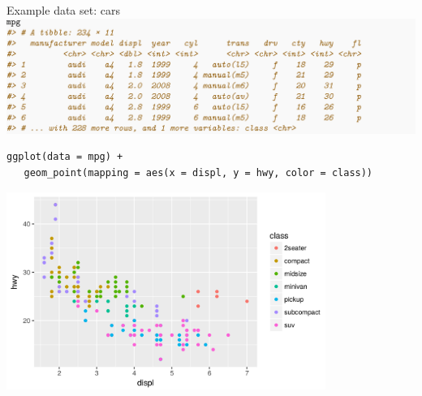 \documentclass[xcolor=table,aspectratio=169]{beamer}
\begin{document}
\begin{frame}{Example data set: cars}
  \includegraphics[width=\textwidth]{pics/hadley-cars.png}
\end{frame}

\begin{frame}[fragile]

  \begin{footnotesize}
\begin{verbatim}
ggplot(data = mpg) +
   geom_point(mapping = aes(x = displ, y = hwy, color = class))
\end{verbatim}
  \end{footnotesize}
  \includegraphics[width=0.78\textwidth]{pics/hadley-simpleplot.png}
\end{frame}
\end{document}
